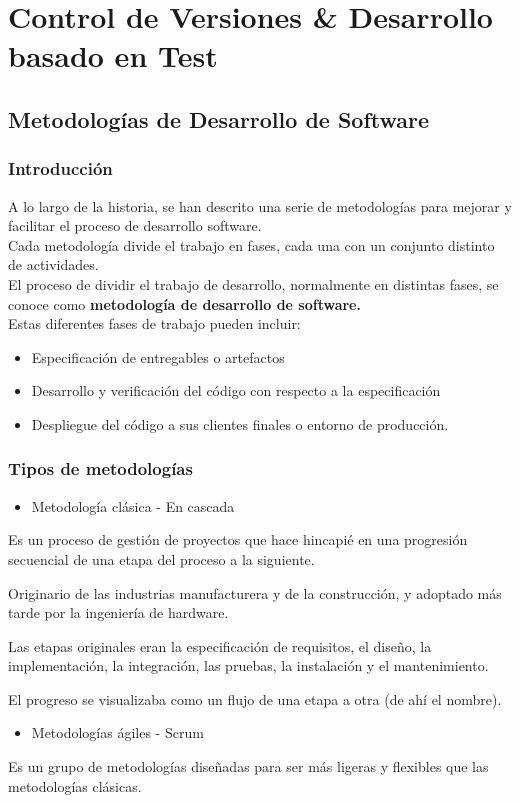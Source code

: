 \section{Control de Versiones \& Desarrollo basado en Test}
\subsection{Metodologías de Desarrollo de Software}
\subsubsection{Introducción}
A lo largo de la historia, se han descrito una serie de metodologías para mejorar y facilitar el proceso de desarrollo software.\\
Cada metodología divide el trabajo en fases, cada una con un conjunto distinto de actividades.\\
El proceso de dividir el trabajo de desarrollo, normalmente en distintas fases, se conoce como \textbf{metodología de desarrollo de software.}\\
Estas diferentes fases de trabajo pueden incluir:
\begin{itemize}
	\item Especificación de entregables o artefactos
	\item Desarrollo y verificación del código con respecto a la especificación
	\item Despliegue del código a sus clientes finales o entorno de producción.
\end{itemize}
\subsubsection{Tipos de metodologías}
\begin{itemize}[label=\color{red}\textbullet, leftmargin=*]
	\item \color{lightblue}Metodología clásica - En cascada
\end{itemize}
Es un proceso de gestión de proyectos que hace hincapié en una progresión secuencial de una etapa del proceso a la siguiente.

Originario de las industrias manufacturera y de la construcción, y adoptado más tarde por la ingeniería de hardware.

Las etapas originales eran la especificación de requisitos, el diseño, la implementación, la integración, las pruebas, la instalación y el mantenimiento.

El progreso se visualizaba como un flujo de una etapa a otra (de ahí el nombre).
\begin{itemize}[label=\color{red}\textbullet, leftmargin=*]
	\item \color{lightblue}Metodologías ágiles - Scrum
\end{itemize}
Es un grupo de metodologías diseñadas para ser más ligeras y flexibles que las metodologías clásicas.

